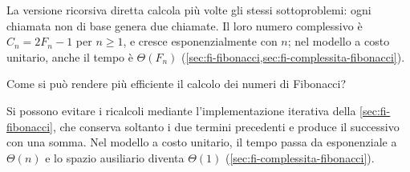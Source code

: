 La versione ricorsiva diretta calcola più volte gli stessi
sottoproblemi: ogni chiamata non di base genera due chiamate.
Il loro numero complessivo è \(C_n=2F_n-1\) per \(n\ge1\),
e cresce esponenzialmente con \(n\); nel modello a costo unitario,
anche il tempo è \(\Theta(F_n)\)
(\cref{sec:fi-fibonacci,sec:fi-complessita-fibonacci}).

\begin{exercise}
\label{ex:fi-esercizi-ricerca-ordinamento-fibonacci-efficiente}
Come si può rendere più efficiente il calcolo dei numeri
di Fibonacci?
\end{exercise}

Si possono evitare i ricalcoli mediante l'implementazione
iterativa della \cref{sec:fi-fibonacci}, che conserva soltanto
i due termini precedenti e produce il successivo con una somma.
Nel modello a costo unitario, il tempo passa da esponenziale
a \(\Theta(n)\) e lo spazio ausiliario diventa \(\Theta(1)\)
(\cref{sec:fi-complessita-fibonacci}).

